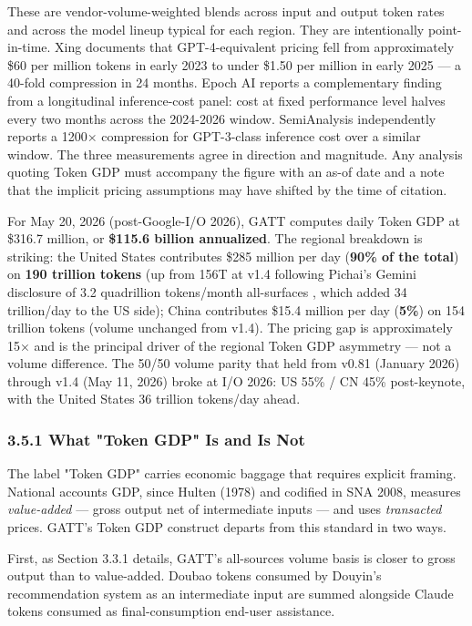 \documentclass[11pt,a4paper]{article}
\begin{document}
These are vendor-volume-weighted blends across input and output token rates and across the model lineup typical for each region. They are intentionally point-in-time. Xing \cite{xing2026token} documents that GPT-4-equivalent pricing fell from approximately \$60 per million tokens in early 2023 to under \$1.50 per million in early 2025 --- a 40-fold compression in 24 months. Epoch AI \cite{epoch2026inference} reports a complementary finding from a longitudinal inference-cost panel: cost at fixed performance level halves every two months across the 2024-2026 window. SemiAnalysis \cite{patel2026semianalysis} independently reports a 1200× compression for GPT-3-class inference cost over a similar window. The three measurements agree in direction and magnitude. Any analysis quoting Token GDP must accompany the figure with an as-of date and a note that the implicit pricing assumptions may have shifted by the time of citation.

For May 20, 2026 (post-Google-I/O 2026), GATT computes daily Token GDP at \$316.7 million, or \textbf{\$115.6 billion annualized}. The regional breakdown is striking: the United States contributes \$285 million per day (\textbf{90\% of the total}) on \textbf{190 trillion tokens} (up from 156T at v1.4 following Pichai's Gemini disclosure of 3.2 quadrillion tokens/month all-surfaces \cite{pichai2026io}, which added 34 trillion/day to the US side); China contributes \$15.4 million per day (\textbf{5\%}) on 154 trillion tokens (volume unchanged from v1.4). The pricing gap is approximately 15× and is the principal driver of the regional Token GDP asymmetry --- not a volume difference. The 50/50 volume parity that held from v0.81 (January 2026) through v1.4 (May 11, 2026) broke at I/O 2026: US 55\% / CN 45\% post-keynote, with the United States 36 trillion tokens/day ahead.

\subsubsection{3.5.1 What "Token GDP" Is and Is Not}

The label "Token GDP" carries economic baggage that requires explicit framing. National accounts GDP, since Hulten (1978) and codified in SNA 2008, measures \emph{value-added} --- gross output net of intermediate inputs --- and uses \emph{transacted} prices. GATT's Token GDP construct departs from this standard in two ways.

First, as Section 3.3.1 details, GATT's all-sources volume basis is closer to gross output than to value-added. Doubao tokens consumed by Douyin's recommendation system as an intermediate input are summed alongside Claude tokens consumed as final-consumption end-user assistance.
\end{document}
